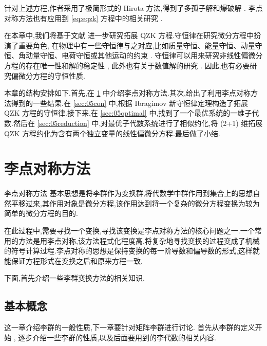 针对上述方程,作者采用了极简形式的 Hirota 方法,得到了多孤子解和爆破解 \cite{biswas2013soli,bluman2010appli}. 李点对称方法也有应用到 \eqref{eq:eqzk} 方程中的相关研究 \cite{sjoberg2007dou}.

在本章中,我们将基于文献 \cite{wang2014soli} 进一步研究拓展 QZK 方程.守恒律在研究微分方程中扮演了重要角色,
在物理中有一些守恒律与之对应,比如质量守恒、能量守恒、动量守恒、角动量守恒、电荷守恒或其他运动的约束 \cite{mushtaq2005non,song2013top,song2013dom}. 守恒律可以用来研究非线性偏微分方程的存在唯一性和解的稳定性 \cite{wang2014soli}, 此外也有关于数值解的研究 \cite{wazwaz2005exact,wazwaz2008the}. 因此,也有必要研究偏微分方程的守恒性质.

本章的结构安排如下.首先,在 \ref{sec:05lie} 中介绍李点对称方法.其次,给出了利用李点对称方法得到的一些结果.在 \ref{sec:05con} 中,根据 Ibragimov 新守恒律定理构造了拓展 QZK 方程的守恒律.接下来,在 \ref{sec:05optimal} 中,找到了一个最优系统的一维子代数.然后在 \ref{sec:05reduction} 中,对最优子代数系统进行了相似约化,将 (2+1) 维拓展 QZK 方程约化为含有两个独立变量的线性偏微分方程.最后做了小结.

\section{李点对称方法}\label{sec:05lie}
李点对称方法 \cite{peter2000sym,bluman2008symmetry} 基本思想是将李群作为变换群,将代数学中群作用到集合上的思想自然平移过来,其作用对象是微分方程,该作用达到将一个复杂的微分方程变换为较为简单的微分方程的目的.

在此过程中,需要寻找一个变换,寻找该变换是李点对称方法的核心问题之一.一个常用的方法是用李点对称,该方法程式化程度高,将复杂地寻找变换的过程变成了机械的符号计算过程.李点对称的思想是保持变换的每一阶导数和偏导数的形式,这样就能保证方程形式在变换之后和原来方程一致.

下面,首先介绍一些李群变换方法的相关知识.

\subsection{基本概念}
这一章介绍李群的一般性质,下一章要针对矩阵李群进行讨论.
首先从李群的定义开始 \cite{kirillov2008anintro}, 逐步介绍一些李群的性质,以及后面要用到的李代数的相关内容.


